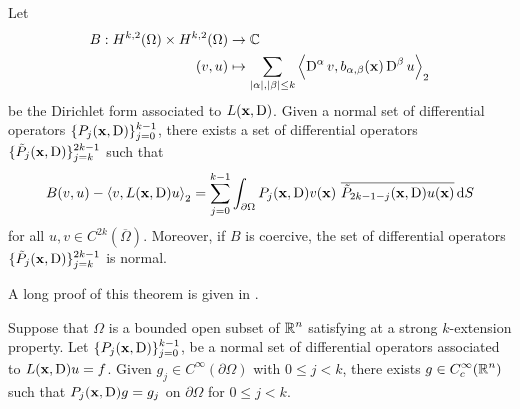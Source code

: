 \begin{theorem}
Let
\begin{equation} \label{ell_adj_BCs}
\begin{split}
B : H^{k,2}(\Omega) \times H^{k,2}(\Omega) & \rightarrow \mathbb{C} \\
(v,u) &\mapsto
\sum_{|\alpha|,|\beta|\leq k}
\left\langle{\operatorname{D}^\alpha v} , {b_{\alpha,\beta}(\mathbf{x}) \operatorname{D}^\beta u}\right\rangle_2
\end{split}
\end{equation}
be the Dirichlet form associated to $L(\mathbf{x},\operatorname{D})$.  Given a normal
set of differential operators
$\displaystyle \{ P_j(\mathbf{x},\operatorname{D})\}_{j=0}^{k-1}$,
there exists a set of differential operators
$\displaystyle \{ \tilde{P}_j(\mathbf{x},\operatorname{D}) \}_{j=k}^{2k-1}$ such that
\[
B(v,u) - \left\langle{v} , {L(\mathbf{x},\operatorname{D})u}\right\rangle_2
= \sum_{j=0}^{k-1} \int_{\partial \Omega} P_j(\mathbf{x},\operatorname{D})v(\mathbf{x})
\ \overline{\tilde{P}_{2k-1-j}(\mathbf{x},\operatorname{D})u(\mathbf{x})} \,\mathrm{d}{S}
\]
for all $\displaystyle u,v \in C^{2k}(\overline{\Omega})$.
Moreover, if $B$ is coercive, the set of differential operators
$\displaystyle \{ \tilde{P}_j(\mathbf{x},\operatorname{D}) \}_{j=k}^{2k-1}$ is normal.
\end{theorem}

A long proof of this theorem is given in \cite{FoPDE}.

\begin{theorem} \label{ell_normal_BCs}
Suppose that $\Omega$ is a bounded open subset of $\displaystyle \mathbb{R}^n$
satisfying at a strong $k$-extension property.
Let $\displaystyle \{ P_j(\mathbf{x},\operatorname{D}) \}_{j=0}^{k-1}$, be a normal set of
differential operators associated to $L(\mathbf{x},\operatorname{D})u=f$.  Given
$\displaystyle g_j\in C^\infty(\partial \Omega)$ with $0\leq j<k$, there
exists $\displaystyle g \in C^\infty_c(\mathbb{R}^n)$ such that
$P_j(\mathbf{x},\operatorname{D})g=g_j$ on $\partial \Omega$ for $0\leq j<k$.
\end{theorem}

